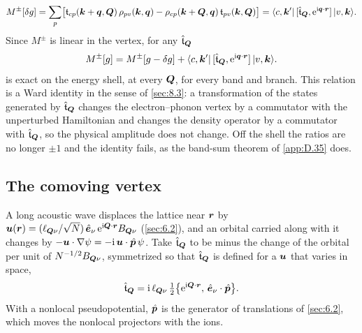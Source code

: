 \begin{equation}
  M^\pm[\delta g] = \sum_p\bigl[\mathfrak{t}_{cp}(\bm{k}+\bm{q},\bm{Q})\,\rho_{pv}(\bm{k},\bm{q}) - \rho_{cp}(\bm{k}+\bm{Q},\bm{q})\,\mathfrak{t}_{pv}(\bm{k},\bm{Q})\bigr]
  = \langle c,\bm{k}'|\,[\hat{\mathfrak{t}}_{\bm{Q}},\mathrm{e}^{\mathrm{i}\bm{q}\cdot\bm{r}}]\,|v,\bm{k}\rangle .
  \label{eq:D.37-contact}
\end{equation}
Since $M^\pm$ is linear in the vertex, for any $\hat{\mathfrak{t}}_{\bm{Q}}$
\begin{equation}
  M^\pm[g] = M^\pm[g - \delta g] + \langle c,\bm{k}'|\,[\hat{\mathfrak{t}}_{\bm{Q}},\mathrm{e}^{\mathrm{i}\bm{q}\cdot\bm{r}}]\,|v,\bm{k}\rangle .
  \label{eq:D.37-ward}
\end{equation}
 is exact on the energy shell, at every $\bm{Q}$, for every band and branch. This relation is a Ward identity in the sense of \cref{sec:8.3}: a transformation of the states generated by $\hat{\mathfrak{t}}_{\bm{Q}}$ changes the electron--phonon vertex by a commutator with the unperturbed Hamiltonian and changes the density operator by a commutator with $\hat{\mathfrak{t}}_{\bm{Q}}$, so the physical amplitude does not change. Off the shell the ratios are no longer $\pm1$ and the identity fails, as the band-sum theorem of \cref{app:D.35} does.

\subsection*{The comoving vertex}

A long acoustic wave displaces the lattice near $\bm{r}$ by $\bm{u}(\bm{r}) = (\ell_{\bm{Q}\nu}/\sqrt N)\,\hat{\bm{e}}_\nu\,\mathrm{e}^{\mathrm{i}\bm{Q}\cdot\bm{r}}B_{\bm{Q}\nu}$ (\cref{sec:6.2}), and an orbital carried along with it changes by $-\bm{u}\cdot\nabla\psi = -\mathrm{i}\,\bm{u}\cdot\hat{\bm{p}}\,\psi$. Take $\hat{\mathfrak{t}}_{\bm{Q}}$ to be minus the change of the orbital per unit of $N^{-1/2}B_{\bm{Q}\nu}$, symmetrized so that $\hat{\mathfrak{t}}_{\bm{Q}}$ is defined for a $\bm{u}$ that varies in space,
\begin{equation}
  \hat{\mathfrak{t}}_{\bm{Q}} = \mathrm{i}\,\ell_{\bm{Q}\nu}\,\tfrac12\bigl\{\mathrm{e}^{\mathrm{i}\bm{Q}\cdot\bm{r}},\,\hat{\bm{e}}_\nu\cdot\hat{\bm{p}}\bigr\} .
  \label{eq:D.37-s}
\end{equation}
With a nonlocal pseudopotential, $\hat{\bm{p}}$ is the generator of translations of \cref{sec:6.2}, which moves the nonlocal projectors with the ions.

